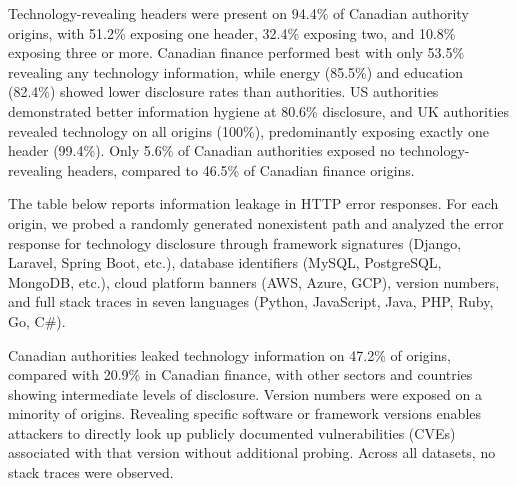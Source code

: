 \documentclass[pdflatex,sn-mathphys-num]{sn-jnl}
\newlength{\inlinecapskip}
\newenvironment{inlinecap}[1][\textwidth]
  {\par\vspace{\inlinecapskip}\noindent\begin{minipage}{#1}\centering}
  {\end{minipage}\par\vspace{\inlinecapskip}}
\numberwithin{equation}{section}
\theoremstyle{thmstyleone}
\theoremstyle{thmstyletwo}%
\theoremstyle{thmstylethree}%
\begin{document}
Technology-revealing headers were present on 94.4\% of Canadian authority origins, 
with 51.2\% exposing one header, 32.4\% exposing two, and 10.8\% exposing three or more. 
Canadian finance performed best with only 53.5\% revealing any technology information, 
while energy (85.5\%) and education (82.4\%) showed lower disclosure rates than authorities. 
US authorities demonstrated better information hygiene at 80.6\% disclosure, and UK
authorities revealed technology on all origins (100\%), predominantly exposing exactly one
header (99.4\%). Only 5.6\% of Canadian authorities exposed no technology-revealing headers,
compared to 46.5\% of Canadian finance origins.

\vspace{1em}The table below reports information leakage in HTTP error responses. 
For each origin, we probed a randomly generated nonexistent path and analyzed the 
error response for technology disclosure through framework signatures (Django, Laravel, 
Spring Boot, etc.), database identifiers (MySQL, PostgreSQL, MongoDB, etc.), cloud platform banners (AWS, Azure, GCP), version numbers, and full stack traces in seven languages (Python, JavaScript, Java, PHP, Ruby, Go, C\#).

\begin{inlinecap}
\label{tab:error_leaks_summary}
\centering
\small
\setlength{\tabcolsep}{4pt}
%
\end{inlinecap}

Canadian authorities leaked technology information on 47.2\% of origins, compared with 20.9\% in Canadian finance, 
with other sectors and countries showing intermediate levels of disclosure. Version numbers were exposed 
on a minority of origins. Revealing specific software or framework versions enables attackers 
to directly look up publicly documented vulnerabilities (CVEs) associated with that version without 
additional probing. Across all datasets, no stack traces were observed.
\end{document}
